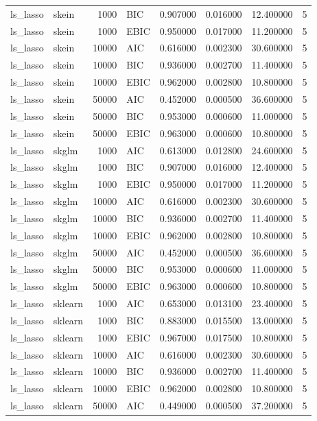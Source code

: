 \begin{table}[t]
\begin{tabular}{llrlrrrr}
ls_lasso & skein & 1000 & BIC & 0.907000 & 0.016000 & 12.400000 & 5 \\
ls_lasso & skein & 1000 & EBIC & 0.950000 & 0.017000 & 11.200000 & 5 \\
ls_lasso & skein & 10000 & AIC & 0.616000 & 0.002300 & 30.600000 & 5 \\
ls_lasso & skein & 10000 & BIC & 0.936000 & 0.002700 & 11.400000 & 5 \\
ls_lasso & skein & 10000 & EBIC & 0.962000 & 0.002800 & 10.800000 & 5 \\
ls_lasso & skein & 50000 & AIC & 0.452000 & 0.000500 & 36.600000 & 5 \\
ls_lasso & skein & 50000 & BIC & 0.953000 & 0.000600 & 11.000000 & 5 \\
ls_lasso & skein & 50000 & EBIC & 0.963000 & 0.000600 & 10.800000 & 5 \\
ls_lasso & skglm & 1000 & AIC & 0.613000 & 0.012800 & 24.600000 & 5 \\
ls_lasso & skglm & 1000 & BIC & 0.907000 & 0.016000 & 12.400000 & 5 \\
ls_lasso & skglm & 1000 & EBIC & 0.950000 & 0.017000 & 11.200000 & 5 \\
ls_lasso & skglm & 10000 & AIC & 0.616000 & 0.002300 & 30.600000 & 5 \\
ls_lasso & skglm & 10000 & BIC & 0.936000 & 0.002700 & 11.400000 & 5 \\
ls_lasso & skglm & 10000 & EBIC & 0.962000 & 0.002800 & 10.800000 & 5 \\
ls_lasso & skglm & 50000 & AIC & 0.452000 & 0.000500 & 36.600000 & 5 \\
ls_lasso & skglm & 50000 & BIC & 0.953000 & 0.000600 & 11.000000 & 5 \\
ls_lasso & skglm & 50000 & EBIC & 0.963000 & 0.000600 & 10.800000 & 5 \\
ls_lasso & sklearn & 1000 & AIC & 0.653000 & 0.013100 & 23.400000 & 5 \\
ls_lasso & sklearn & 1000 & BIC & 0.883000 & 0.015500 & 13.000000 & 5 \\
ls_lasso & sklearn & 1000 & EBIC & 0.967000 & 0.017500 & 10.800000 & 5 \\
ls_lasso & sklearn & 10000 & AIC & 0.616000 & 0.002300 & 30.600000 & 5 \\
ls_lasso & sklearn & 10000 & BIC & 0.936000 & 0.002700 & 11.400000 & 5 \\
ls_lasso & sklearn & 10000 & EBIC & 0.962000 & 0.002800 & 10.800000 & 5 \\
ls_lasso & sklearn & 50000 & AIC & 0.449000 & 0.000500 & 37.200000 & 5 \\

\end{tabular}
\end{table}
